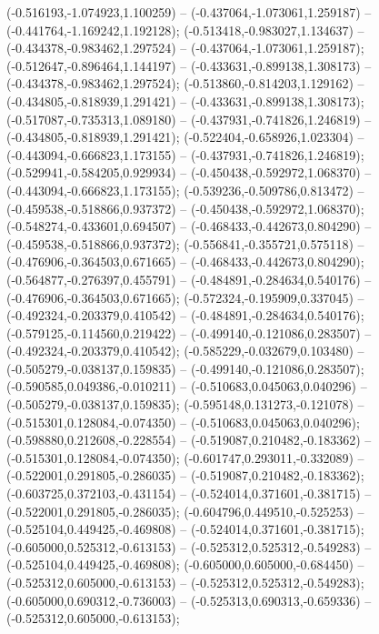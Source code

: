  (-0.516193,-1.074923,1.100259) -- (-0.437064,-1.073061,1.259187) -- (-0.441764,-1.169242,1.192128);
 (-0.513418,-0.983027,1.134637) -- (-0.434378,-0.983462,1.297524) -- (-0.437064,-1.073061,1.259187);
 (-0.512647,-0.896464,1.144197) -- (-0.433631,-0.899138,1.308173) -- (-0.434378,-0.983462,1.297524);
 (-0.513860,-0.814203,1.129162) -- (-0.434805,-0.818939,1.291421) -- (-0.433631,-0.899138,1.308173);
 (-0.517087,-0.735313,1.089180) -- (-0.437931,-0.741826,1.246819) -- (-0.434805,-0.818939,1.291421);
 (-0.522404,-0.658926,1.023304) -- (-0.443094,-0.666823,1.173155) -- (-0.437931,-0.741826,1.246819);
 (-0.529941,-0.584205,0.929934) -- (-0.450438,-0.592972,1.068370) -- (-0.443094,-0.666823,1.173155);
 (-0.539236,-0.509786,0.813472) -- (-0.459538,-0.518866,0.937372) -- (-0.450438,-0.592972,1.068370);
 (-0.548274,-0.433601,0.694507) -- (-0.468433,-0.442673,0.804290) -- (-0.459538,-0.518866,0.937372);
 (-0.556841,-0.355721,0.575118) -- (-0.476906,-0.364503,0.671665) -- (-0.468433,-0.442673,0.804290);
 (-0.564877,-0.276397,0.455791) -- (-0.484891,-0.284634,0.540176) -- (-0.476906,-0.364503,0.671665);
 (-0.572324,-0.195909,0.337045) -- (-0.492324,-0.203379,0.410542) -- (-0.484891,-0.284634,0.540176);
 (-0.579125,-0.114560,0.219422) -- (-0.499140,-0.121086,0.283507) -- (-0.492324,-0.203379,0.410542);
 (-0.585229,-0.032679,0.103480) -- (-0.505279,-0.038137,0.159835) -- (-0.499140,-0.121086,0.283507);
 (-0.590585,0.049386,-0.010211) -- (-0.510683,0.045063,0.040296) -- (-0.505279,-0.038137,0.159835);
 (-0.595148,0.131273,-0.121078) -- (-0.515301,0.128084,-0.074350) -- (-0.510683,0.045063,0.040296);
 (-0.598880,0.212608,-0.228554) -- (-0.519087,0.210482,-0.183362) -- (-0.515301,0.128084,-0.074350);
 (-0.601747,0.293011,-0.332089) -- (-0.522001,0.291805,-0.286035) -- (-0.519087,0.210482,-0.183362);
 (-0.603725,0.372103,-0.431154) -- (-0.524014,0.371601,-0.381715) -- (-0.522001,0.291805,-0.286035);
 (-0.604796,0.449510,-0.525253) -- (-0.525104,0.449425,-0.469808) -- (-0.524014,0.371601,-0.381715);
 (-0.605000,0.525312,-0.613153) -- (-0.525312,0.525312,-0.549283) -- (-0.525104,0.449425,-0.469808);
 (-0.605000,0.605000,-0.684450) -- (-0.525312,0.605000,-0.613153) -- (-0.525312,0.525312,-0.549283);
 (-0.605000,0.690312,-0.736003) -- (-0.525313,0.690313,-0.659336) -- (-0.525312,0.605000,-0.613153);
